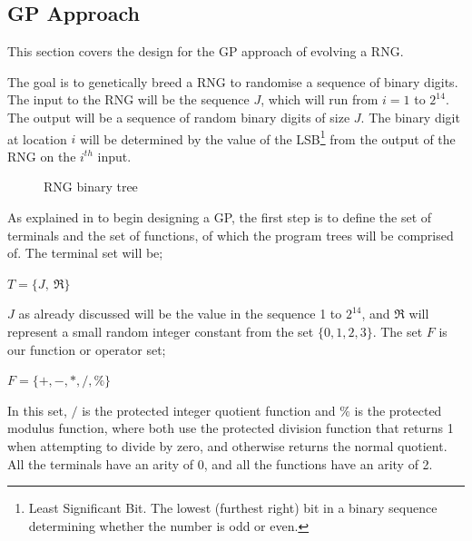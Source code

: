 \documentclass[a4paper,10.5pt]{article}
\begin{document}
\subsection{GP Approach}
This section covers the design for the GP approach of evolving a RNG. 

The goal is to genetically breed a RNG to randomise a sequence of binary digits. The input to the RNG will be the sequence $J$, which will run from $i = 1$ to $2^{14}$. The output will be a sequence of random binary digits of size $J$. The binary digit at location $i$ will be determined by the value of the LSB\footnote{Least Significant Bit. The lowest (furthest right) bit in a binary sequence determining whether the number is odd or even.} from the output of the RNG on the $i^{th}$ input.

\begin{figure}
\caption{RNG binary tree}
\label{fig:simplebintree}
\end{figure}

As explained in \cite[p.19-27]{introgp} to begin designing a GP, the first step is to define the set of terminals and the set of functions, of which the program trees will be comprised of. The terminal set will be; \begin{center}$T = \{J,\ \Re\}$\end{center} $J$ as already discussed will be the value in the sequence 1 to $2^{14}$, and $\Re$ will represent a small random integer constant from the set $\{0, 1, 2, 3\}$. The set $F$ is our function or operator set; \begin{center}$F = \{+, -, *, /, \%\}$\end{center}In this set, $/$ is the protected integer quotient function and $\%$ is the protected modulus function, where both use the protected division function that returns 1 when attempting to divide by zero, and otherwise returns the normal quotient. All the terminals have an arity of 0, and all the functions have an arity of 2.
\end{document}
